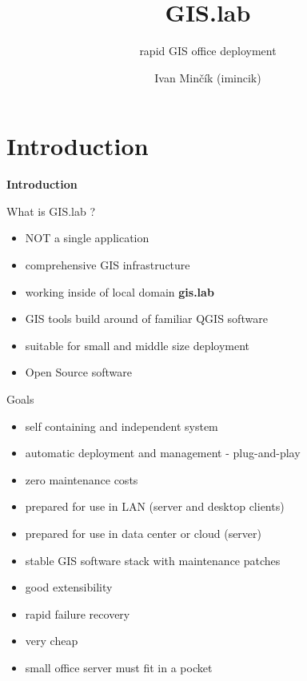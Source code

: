 \documentclass[12pt]{beamer}
\title{GIS.lab}
\subtitle{rapid GIS office deployment}
\author{Ivan Minčík (imincik)}
\institute{FOSS4G-Europe 2014, Bremen}
\date{}
\begin{document}
\begin{frame}
	\titlepage
\end{frame}


\section{Introduction}
\begin{frame}
	\begin{center}
		\LARGE\textbf{Introduction}	
	\end{center}
\end{frame}


\begin{frame}{What is GIS.lab ?}
	\begin{itemize}[<+->]
		\item NOT a single application
		\item comprehensive GIS infrastructure
		\item working inside of local domain \textbf{gis.lab}
		\item GIS tools build around of familiar QGIS software
		\item suitable for small and middle size deployment
		\item Open Source software
	\end{itemize}
\end{frame}


\begin{frame}{Goals}
	\begin{itemize}[<+->]
		\item self containing and independent system
		\item automatic deployment and management - plug-and-play
		\item zero maintenance costs
		\item prepared for use in LAN (server and desktop clients)
		\item prepared for use in data center or cloud (server)
		\item stable GIS software stack with maintenance patches
		\item good extensibility
		\item rapid failure recovery	
		\item very cheap
		\item small office server must fit in a pocket
	\end{itemize}
\end{frame}
\end{document}
